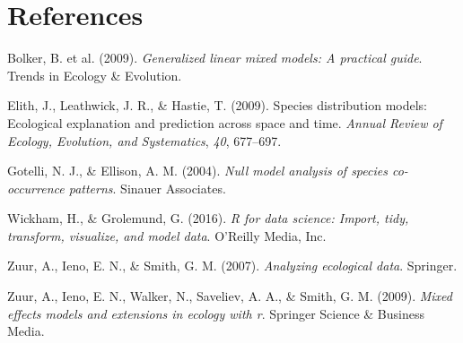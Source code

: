 \documentclass[
  letterpaper,
]{book}
\newlength{\cslhangindent}
\newenvironment{CSLReferences}[2] %
 {\begin{list}{}{%
  \setlength{\itemindent}{0pt}
  \setlength{\leftmargin}{0pt}
  \setlength{\parsep}{0pt}
  \ifodd #1
   \setlength{\leftmargin}{\cslhangindent}
   \setlength{\itemindent}{-1\cslhangindent}
  \fi
  \setlength{\itemsep}{#2\baselineskip}}}
 {\end{list}}
\begin{document}

\chapter*{References}\label{references}


\label{refs}
\begin{CSLReferences}{1}{0}
Bolker, B. et al. (2009). \emph{Generalized linear mixed models: A
practical guide}. Trends in Ecology \& Evolution.

Elith, J., Leathwick, J. R., \& Hastie, T. (2009). Species distribution
models: Ecological explanation and prediction across space and time.
\emph{Annual Review of Ecology, Evolution, and Systematics}, \emph{40},
677--697.

Gotelli, N. J., \& Ellison, A. M. (2004). \emph{Null model analysis of
species co-occurrence patterns}. Sinauer Associates.

Wickham, H., \& Grolemund, G. (2016). \emph{R for data science: Import,
tidy, transform, visualize, and model data}. O'Reilly Media, Inc.

Zuur, A., Ieno, E. N., \& Smith, G. M. (2007). \emph{Analyzing
ecological data}. Springer.

Zuur, A., Ieno, E. N., Walker, N., Saveliev, A. A., \& Smith, G. M.
(2009). \emph{Mixed effects models and extensions in ecology with r}.
Springer Science \& Business Media.

\end{CSLReferences}


\backmatter
\end{document}
